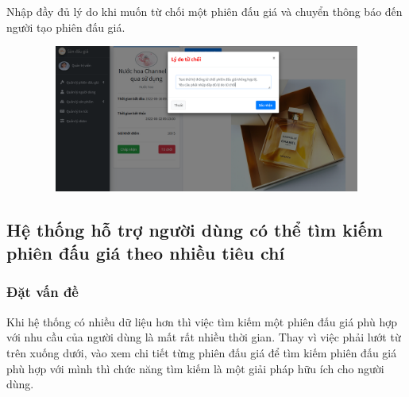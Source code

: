 \documentclass{article}
\begin{document}
Nhập đầy đủ lý do khi muốn từ chối một phiên đấu giá và chuyển thông báo đến người tạo phiên đấu giá.
\begin{figure}[H]
    \centering
    \includegraphics[width=11.4cm,height=4.83cm]{images/adminreject.png}
\end{figure}
\subsection{Hệ thống hỗ trợ người dùng có thể tìm kiếm phiên đấu giá theo nhiều tiêu chí}
\subsubsection{Đặt vấn đề}
Khi hệ thống có nhiều dữ liệu hơn thì việc tìm kiếm một phiên đấu giá phù hợp với nhu cầu của người dùng là mất rất nhiều thời gian. Thay vì việc phải lướt từ trên xuống dưới, vào xem chi tiết từng phiên đấu giá để tìm kiếm phiên đấu giá phù hợp với mình thì chức năng tìm kiếm là một giải pháp hữu ích cho người dùng.
\end{document}
